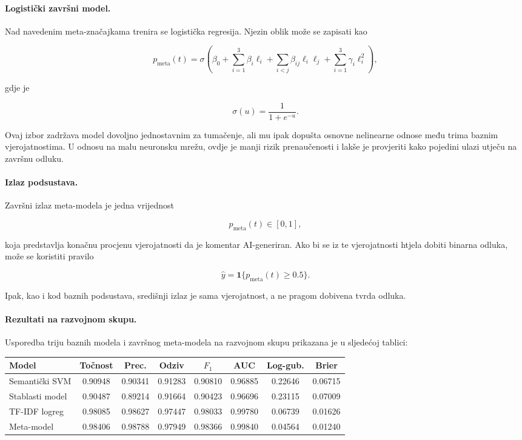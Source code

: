 \paragraph{Logistički završni model.}
Nad navedenim meta-značajkama trenira se logistička regresija. Njezin oblik može se zapisati kao

\[
p_{\mathrm{meta}}(t)=\sigma\left(
\beta_0
+\sum_{i=1}^{3}\beta_i\ell_i
+\sum_{i<j}\beta_{ij}\ell_i\ell_j
+\sum_{i=1}^{3}\gamma_i\ell_i^2
\right),
\]

gdje je

\[
\sigma(u)=\frac{1}{1+e^{-u}}.
\]

Ovaj izbor zadržava model dovoljno jednostavnim za tumačenje, ali mu ipak dopušta osnovne nelinearne odnose među trima baznim vjerojatnostima. U odnosu na malu neuronsku mrežu, ovdje je manji rizik prenaučenosti i lakše je provjeriti kako pojedini ulazi utječu na završnu odluku.

\paragraph{Izlaz podsustava.}
Završni izlaz meta-modela je jedna vrijednost

\[
p_{\mathrm{meta}}(t)\in[0,1],
\]

koja predstavlja konačnu procjenu vjerojatnosti da je komentar AI-generiran. Ako bi se iz te vjerojatnosti htjela dobiti binarna odluka, može se koristiti pravilo

\[
\hat y = \mathbf{1}\{p_{\mathrm{meta}}(t)\ge 0.5\}.
\]

Ipak, kao i kod baznih podsustava, središnji izlaz je sama vjerojatnost, a ne pragom dobivena tvrda odluka.

\paragraph{Rezultati na razvojnom skupu.}
Usporedba triju baznih modela i završnog meta-modela na razvojnom skupu prikazana je u sljedećoj tablici:

{\small
\setlength{\tabcolsep}{4pt}
\begin{center}
\begin{tabular}{lccccccc}
\hline
Model & Točnost & Prec. & Odziv & $F_1$ & AUC & Log-gub. & Brier \\
\hline
Semantički SVM & 0.90948 & 0.90341 & 0.91283 & 0.90810 & 0.96885 & 0.22646 & 0.06715 \\
Stablasti model & 0.90487 & 0.89214 & 0.91664 & 0.90423 & 0.96696 & 0.23115 & 0.07009 \\
TF-IDF logreg & 0.98085 & 0.98627 & 0.97447 & 0.98033 & 0.99780 & 0.06739 & 0.01626 \\
Meta-model & 0.98406 & 0.98788 & 0.97949 & 0.98366 & 0.99840 & 0.04564 & 0.01240 \\
\hline
\end{tabular}
\end{center}
}

